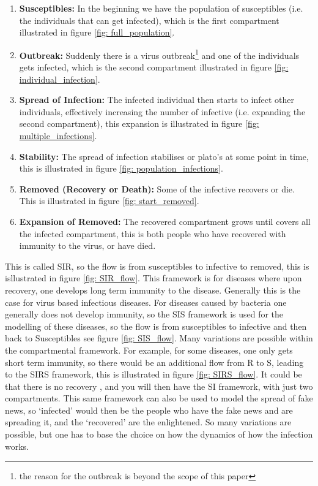 \documentclass[fontsize=17pt]{article}
\begin{document}
\begin{enumerate}
	\item \textbf{Susceptibles:} In the beginning we have the population of susceptibles (i.e. the individuals that can get infected), which is the first compartment illustrated in figure \ref{fig: full_population}. 
	\item \textbf{Outbreak:} Suddenly there is a virus outbreak\footnote{the reason for the outbreak is beyond the scope of this paper} and one of the individuals gets infected, which is the second compartment illustrated in figure \ref{fig: individual_infection}. 
	\item \textbf{Spread of Infection:} The infected individual then starts to infect other individuals, effectively increasing the number of infective (i.e. expanding the second compartment), this expansion is illustrated in figure \ref{fig: multiple_infections}.
	\item \textbf{Stability:} The spread of infection stabilises or plato's at some point in time, this is illustrated in figure \ref{fig: population_infections}.
	\item \textbf{Removed (Recovery or Death): }Some of the infective recovers or die. This is illustrated in figure \ref{fig: start_removed}.
	\item \textbf{Expansion of Removed: }The recovered compartment grows until covers all the infected compartment, this is both people who have recovered with immunity to the virus, or have died.
	
\end{enumerate}

This is called SIR, so the flow is from susceptibles to infective to removed, this is isllustrated in figure \ref{fig: SIR_flow}. This framework is for diseases where upon recovery, one develops long term immunity to the disease. Generally this is the case for virus based infectious diseases. For diseases caused by bacteria one generally does not develop immunity, so the SIS framework is used for the modelling of these diseases, so the flow is from susceptibles to infective and then back to Susceptibles see figure \ref{fig: SIS_flow}.
Many variations are possible within the compartmental framework. For example, for some diseases, one only gets short term immunity, so there would be an additional flow from R to S, leading to the SIRS framework, this is illustrated in figure \ref{fig: SIRS_flow}. It could be that there is no recovery , and you will then have the SI framework, with just two compartments. This same framework can also be used to model the spread of fake news, so `infected' would then be the people who have the fake news and are spreading it, and the `recovered' are the enlightened. So many variations are possible, but one has to base the choice on how the dynamics of how the infection works.
\end{document}
